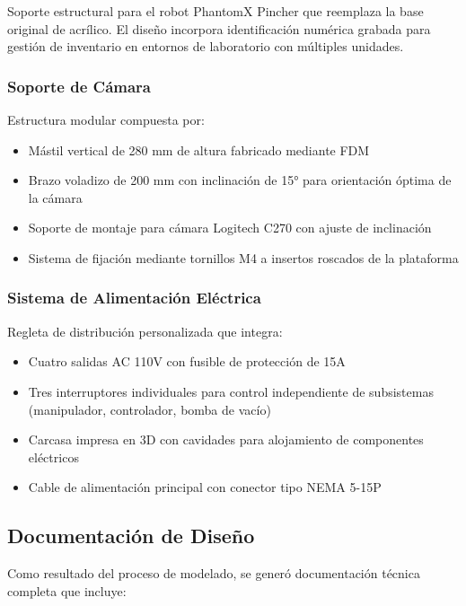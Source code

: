 Soporte estructural para el robot PhantomX Pincher que reemplaza la base original de acrílico. El diseño incorpora identificación numérica grabada para gestión de inventario en entornos de laboratorio con múltiples unidades.

\subsubsection{Soporte de Cámara}

Estructura modular compuesta por:
\begin{itemize}
    \item Mástil vertical de 280 mm de altura fabricado mediante FDM
    \item Brazo voladizo de 200 mm con inclinación de 15° para orientación óptima de la cámara
    \item Soporte de montaje para cámara Logitech C270 con ajuste de inclinación
    \item Sistema de fijación mediante tornillos M4 a insertos roscados de la plataforma
\end{itemize}

\subsubsection{Sistema de Alimentación Eléctrica}

Regleta de distribución personalizada que integra:
\begin{itemize}
    \item Cuatro salidas AC 110V con fusible de protección de 15A
    \item Tres interruptores individuales para control independiente de subsistemas (manipulador, controlador, bomba de vacío)
    \item Carcasa impresa en 3D con cavidades para alojamiento de componentes eléctricos
    \item Cable de alimentación principal con conector tipo NEMA 5-15P
\end{itemize}

\subsection{Documentación de Diseño}

Como resultado del proceso de modelado, se generó documentación técnica completa que incluye:

